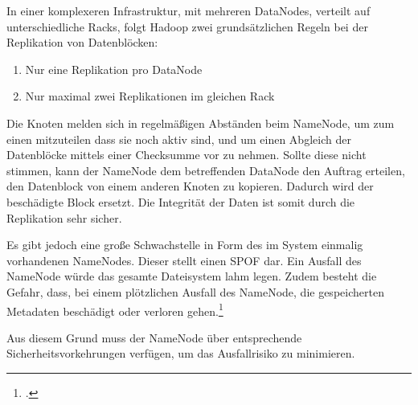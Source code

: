 In einer komplexeren Infrastruktur, mit mehreren DataNodes, verteilt auf unterschiedliche Racks, folgt Hadoop zwei grundsätzlichen Regeln bei der Replikation von Datenblöcken:

\begin{enumerate}
	\item Nur eine Replikation pro DataNode
	\item Nur maximal zwei Replikationen im gleichen Rack
\end{enumerate}

Die Knoten melden sich in regelmäßigen Abständen beim NameNode, um zum einen mitzuteilen dass sie noch aktiv sind, und um einen Abgleich der Datenblöcke mittels einer Checksumme vor zu nehmen. Sollte diese nicht stimmen, kann der NameNode dem betreffenden DataNode den Auftrag erteilen, den Datenblock von einem anderen Knoten zu kopieren. Dadurch wird der beschädigte Block ersetzt. Die Integrität der Daten ist somit durch die Replikation sehr sicher.

Es gibt jedoch eine große Schwachstelle in Form des im System einmalig vorhandenen NameNodes. Dieser stellt einen \ac{SPOF} dar. Ein Ausfall des NameNode würde das gesamte Dateisystem lahm legen. Zudem besteht die Gefahr, dass, bei einem plötzlichen Ausfall des NameNode, die gespeicherten Metadaten beschädigt oder verloren gehen.\footcite[Vgl.][S. 277 f.]{Wartala.2012}

Aus diesem Grund muss der NameNode über entsprechende Sicherheitsvorkehrungen verfügen, um das Ausfallrisiko zu minimieren.



